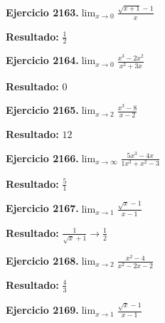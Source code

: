 \documentclass[10pt,a4paper]{article}
\begin{document}
\begin{ejbox}
\textbf{Ejercicio 2163.}\quad $\lim_{x\to 0} \frac{\sqrt{x+1}-1}{x}$
\end{ejbox}

\begin{solbox}
\textbf{Resultado:} \(\displaystyle \frac{1}{2}\)
\end{solbox}

\begin{ejbox}
\textbf{Ejercicio 2164.}\quad $\lim_{x\to 0} \frac{x^3-2x^2}{x^2+3x}$
\end{ejbox}

\begin{solbox}
\textbf{Resultado:} \(\displaystyle 0\)
\end{solbox}

\newpage
\begin{ejbox}
\textbf{Ejercicio 2165.}\quad $\lim_{x\to 2} \frac{x^3-8}{x-2}$
\end{ejbox}

\begin{solbox}
\textbf{Resultado:} \(\displaystyle 12\)
\end{solbox}

\begin{ejbox}
\textbf{Ejercicio 2166.}\quad $\lim_{x\to \infty} \frac{5x^3 - 4x}{1x^3 + x^2 - 3}$
\end{ejbox}

\begin{solbox}
\textbf{Resultado:} \(\displaystyle \frac{5}{1}\)
\end{solbox}

\begin{ejbox}
\textbf{Ejercicio 2167.}\quad $\lim_{x\to 1} \frac{\sqrt{x}-1}{x-1}$
\end{ejbox}

\begin{solbox}
\textbf{Resultado:} \(\displaystyle \frac{1}{\sqrt{x}+1} \to \frac{1}{2}\)
\end{solbox}

\newpage
\begin{ejbox}
\textbf{Ejercicio 2168.}\quad $\lim_{x\to 2} \frac{x^2-4}{x^2-2x-2}$
\end{ejbox}

\begin{solbox}
\textbf{Resultado:} \(\displaystyle \frac{4}{3}\)
\end{solbox}

\begin{ejbox}
\textbf{Ejercicio 2169.}\quad $\lim_{x\to 1} \frac{\sqrt{x}-1}{x-1}$
\end{ejbox}
\end{document}
